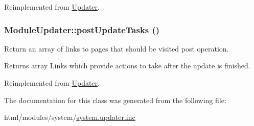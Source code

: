 Reimplemented from \hyperlink{classUpdater_a59eb832c6bb80dd9f04fc85c8ebe8905}{Updater}.\hypertarget{classModuleUpdater_a120524659a6f049fd27dbf487a61af0e}{
\subsubsection[{postUpdateTasks}]{\setlength{\rightskip}{0pt plus 5cm}ModuleUpdater::postUpdateTasks ()}}
\label{classModuleUpdater_a120524659a6f049fd27dbf487a61af0e}
Return an array of links to pages that should be visited post operation.

\begin{DoxyReturn}{Returns}
array Links which provide actions to take after the update is finished. 
\end{DoxyReturn}


Reimplemented from \hyperlink{classUpdater_a377feb2830d31884f8ff1ff152d94576}{Updater}.

The documentation for this class was generated from the following file:\begin{DoxyCompactItemize}
\item 
html/modules/system/\hyperlink{system_8updater_8inc}{system.updater.inc}\end{DoxyCompactItemize}
